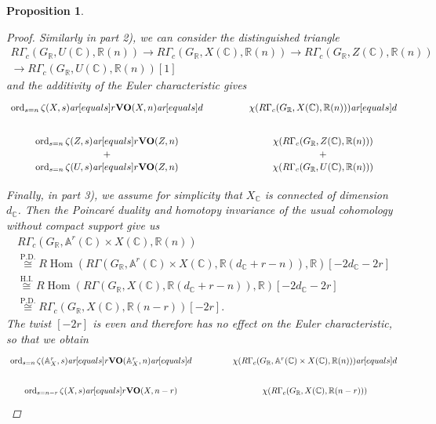 \documentclass[10pt,a4paper,oneside,draft]{article}
\DeclareMathOperator{\Hom}{Hom}
\DeclareMathOperator{\ord}{ord}
\newcommand{\CC}{\mathbb{C}}
\newcommand{\RR}{\mathbb{R}}
\renewcommand{\AA}{\mathbb{A}}
\newcommand{\ar}{\text{\it ar}}
\newcommand{\RHom}{R\!\Hom}
\theoremstyle{myplain}
\newtheorem{proposition}[theorem]{Proposition}
\theoremstyle{mydefinition}
\numberwithin{equation}{section}
\begin{document}
\begin{proposition}
\begin{proof}
    Similarly in part 2), we can consider the distinguished triangle
    \begin{multline*}
      R\Gamma_c (G_\RR, U (\CC), \RR (n)) \to
      R\Gamma_c (G_\RR, X (\CC), \RR (n)) \to
      R\Gamma_c (G_\RR, Z (\CC), \RR (n)) \\
      \to R\Gamma_c (G_\RR, U (\CC), \RR (n)) [1]
  \end{multline*}
  and the additivity of the Euler characteristic gives
  \[ \begin{tikzcd}[column sep=4em]
      \ord_{s=n} \zeta (X,s) \ar[equals]{r}{\mathbf{VO} (X,n)}\ar[equals]{d} & \chi (R\Gamma_c (G_\RR, X(\CC), \RR (n))) \ar[equals]{d} \\
      \ord_{s=n} \zeta (Z,s) \ar[equals]{r}{\mathbf{VO} (Z,n)} & \chi (R\Gamma_c (G_\RR, Z (\CC), \RR (n))) \\[-2em]
      + & + \\[-2em]
      \ord_{s=n} \zeta (U,s) \ar[equals]{r}{\mathbf{VO} (Z,n)} & \chi (R\Gamma_c (G_\RR, U (\CC), \RR (n)))
    \end{tikzcd} \]

  Finally, in part 3), we assume for simplicity that $X_\CC$ is connected of
  dimension $d_\CC$. Then the Poincar\'{e} duality and homotopy invariance of
  the usual cohomology without compact support give us
  \begin{multline*}
    R\Gamma_c (G_\RR, \AA^r (\CC) \times X (\CC), \RR (n)) \\
    \stackrel{\text{P.D.}}{\cong}
    \RHom (R\Gamma (G_\RR, \AA^r (\CC) \times X (\CC), \RR (d_\CC + r - n)), \RR) [-2d_\CC - 2r] \\
    \stackrel{\text{H.I.}}{\cong}
    \RHom (R\Gamma (G_\RR, X (\CC), \RR (d_\CC + r - n)), \RR) [-2d_\CC - 2r] \\
    \stackrel{\text{P.D.}}{\cong}
    R\Gamma_c (G_\RR, X (\CC), \RR (n - r)) [-2r].
  \end{multline*}
  The twist $[-2r]$ is even and therefore has no effect on the Euler
  characteristic, so that we obtain
  \[ \begin{tikzcd}[column sep=4em]
      \ord_{s=n} \zeta (\AA^r_X,s) \ar[equals]{r}{\mathbf{VO} (\AA^r_X,n)}\ar[equals]{d} & \chi (R\Gamma_c (G_\RR, \AA^r (\CC) \times X(\CC), \RR (n))) \ar[equals]{d} \\
      \ord_{s=n-r} \zeta (X,s) \ar[equals]{r}{\mathbf{VO} (X,n-r)} & \chi (R\Gamma_c (G_\RR, X (\CC), \RR (n-r)))
    \end{tikzcd} \]
  \end{proof}
\end{proposition}
\end{document}
